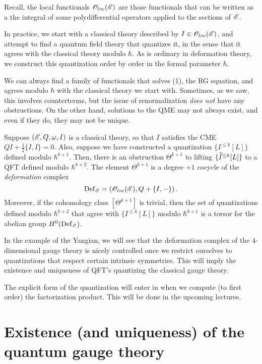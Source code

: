 \documentclass[11pt]{amsart}
\begin{document}
\begin{rmk}
Recall, the local functionals $\sO_{loc}(\sE)$ are those functionals that can be written as a the integral of some polydifferential operators applied to the sections of $\sE$. 
\end{rmk}

In practice, we start with a classical theory described by $I \in \sO_{loc}(\sE)$, and attempt to find a quantum field theory that quantizes it, in the sense that it agrees with the classical theory modulo $\hbar$. 
As is ordinary in deformation theory, we construct this quantization order by order in the formal parameter $\hbar$. 

We can always find a family of functionals that solves (1), the RG equation, and agrees modulo $\hbar$ with the classical theory we start with. 
Sometimes, as we saw, this involves counterterms, but the issue of renormalization {\em does not} have any obstructions. 
On the other hand, solutions to the QME may not always exist, and even if they do, they may not be unique. 

\begin{thm} 
Suppose $(\sE, Q, \omega, I)$ is a classical theory, so that $I$ satisfies the CME $Q I + \frac{1}{2} \{I,I\}= 0$. 
Also, suppose we have constructed a quantization $\{I^{\leq k}[L]\}$ defined modulo $\hbar^{k+1}$. 
Then, there is an obstruction $\Theta^{k+1}$ to lifting $\{\Tilde{I}^{\leq k}[L]\}$ to a QFT defined modulo $\hbar^{k+2}$.
The element $\Theta^{k+1}$ is a degree $+1$ cocycle of the {\em deformation} complex
\[
{\rm Def}_{\sE} = \left(\sO_{loc}(\sE), Q + \{I,-\}\right) .
\]
Moreover, if the cohomology class $[\Theta^{k+1}]$ is trivial, then the set of quantizations defined modulo $\hbar^{k+2}$ that agree with $\{I^{\leq k}[L]\}$ modulo $\hbar^{k+1}$ is a torsor for the abelian group $H^0({\rm Def}_{\sE})$. 
\end{thm}

In the example of the Yangian, we will see that the deformation complex of the $4$-dimensional gauge theory is nicely controlled once we restrict ourselves to quantizations that respect certain intrinsic symmetries. 
This will imply the existence and uniqueness of QFT's quantizing the classical gauge theory.

The explicit form of the quantization will enter in when we compute (to first order) the factorization product.
This will be done in the upcoming lectures.

\section{Existence (and uniqueness) of the quantum gauge theory}
\end{document}
